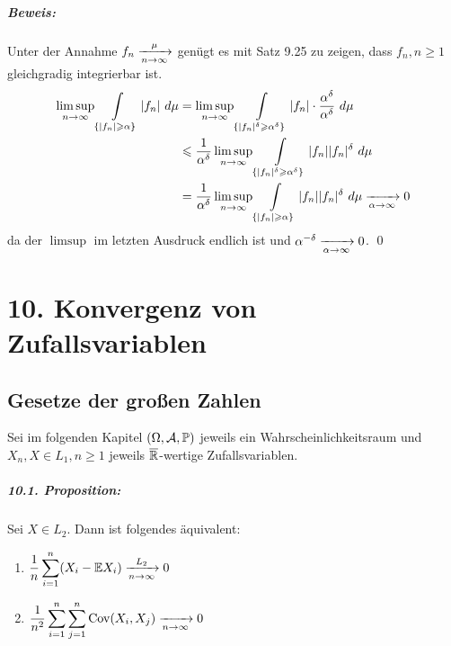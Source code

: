 \documentclass[11pt]{report}
\begin{document}
\paragraph{Beweis:}Unter der Annahme $f_n\nto{\mu}{n\to\infty}$ gen\"ugt es mit Satz 9.25 zu zeigen, dass $f_n,n\geq1$ gleichgradig integrierbar ist.
\begin{align*}
    \limsup_{n\to\infty}\int\displaylimits_{\{|f_n|\geq\alpha\}}|f_n|\ d\mu&= \limsup_{n\to\infty}\int\displaylimits_{\{|f_n|^\delta\geq\alpha^\delta\}}|f_n|\cdot\dfrac{\alpha^\delta}{\alpha^\delta}\ d\mu\\ 
    &\leq\dfrac{1}{\alpha^\delta}\limsup_{n\to\infty}\int\displaylimits_{\{|f_n|^\delta\geq\alpha^\delta\}}|f_n||f_n|^\delta\ d\mu \\
    &=\dfrac{1}{\alpha^\delta}\limsup_{n\to\infty}\int\displaylimits_{\{|f_n|\geq\alpha\}}|f_n||f_n|^\delta\ d\mu\nto{}{\alpha\to\infty}0
\end{align*}
da der $\limsup$ im letzten Ausdruck endlich ist und $\alpha^{-\delta}\nto{}{\alpha\to\infty}0$. \qed

\chapter*{10. Konvergenz von Zufallsvariablen}

\section*{Gesetze der gro\ss{}en Zahlen}

Sei im folgenden Kapitel $(\Omega,\mathcal{A},\mathbb{P})$ jeweils ein
Wahrscheinlichkeitsraum und $X_n,X\in L_1, n\geq1$ jeweils
$\overline{\mathbb{R}}$-wertige Zufallsvariablen.

\paragraph{10.1. Proposition:} Sei $X\in L_2$. Dann ist folgendes
\"aquivalent:
\begin{enumerate}
    \item $\dfrac{1}{n}\displaystyle\sum_{i=1}^n(X_i-\E X_i)\nto{L_2}{n\to\infty}0$
	\item $\dfrac{1}{n^2}\displaystyle\sum_{i=1}^n\sum_{j=1}^n\operatorname{Cov}(X_i,X_j)\nto{}{n\to\infty}0$
\end{enumerate}
\end{document}
